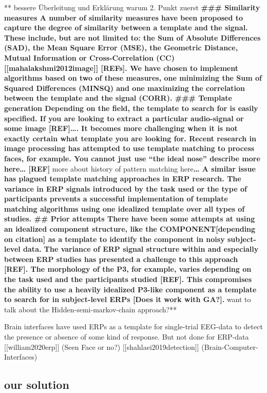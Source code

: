 \documentclass[
  man,floatsintext]{apa7}
\begin{document}
** bessere Überleitung und Erklärung warum 2. Punkt zuerst \textbf{
\#\#\# Similarity measures
A number of similarity measures have been proposed to capture the degree of similarity between a template and the signal. These include, but are not limited to: the Sum of Absolute Differences (SAD), the Mean Square Error (MSE), the Geometric Distance, Mutual Information or Cross-Correlation (CC){[}{[}mahalakshmi2012image{]}{]} {[}REFs{]}. We have chosen to implement algorithms based on two of these measures, one minimizing the Sum of Squared Differences (MINSQ) and one maximizing the correlation between the template and the signal (CORR).
\#\#\# Template generation
Depending on the field, the template to search for is easily specified. If you are looking to extract a particular audio-signal or some image {[}REF{]}\ldots. It becomes more challenging when it is not exactly certain what template you are looking for. Recent research in image processing has attempted to use template matching to process faces, for example. You cannot just use ``the ideal nose'' describe more here\ldots{} {[}REF{]} }more about history of pattern matching here\textbf{\ldots{} A similar issue has plagued template matching approaches in ERP research. The variance in ERP signals introduced by the task used or the type of participants prevents a successful implementation of template matching algorithms using one idealized template over all types of studies.
\#\# Prior attempts
There have been some attempts at using an idealized component structure, like the COMPONENT{[}depending on citation{]} as a template to identify the component in noisy subject-level data. The variance of ERP signal structure within and especially between ERP studies has presented a challenge to this approach {[}REF{]}. The morphology of the P3, for example, varies depending on the task used and the participants studied {[}REF{]}. This compromises the ability to use a heavily idealized P3-like component as a template to search for in subject-level ERPs {[}Does it work with GA?{]}. }want to talk about the Hidden-semi-markov-chain approach?**

Brain interfaces have used ERPs as a template for single-trial EEG-data to detect the presence or absence of some kind of response. But not done for ERP-data {[}{[}william2020erp{]}{]} (Seen Face or no?) {[}{[}shahlaei2019detection{]}{]} (Brain-Computer-Interfaces)

\hypertarget{our-solution}{%
\subsection{our solution}\label{our-solution}}
\end{document}

